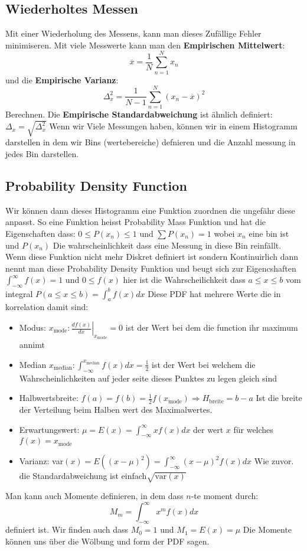 \documentclass{article}
\begin{document}
\hypertarget{PDF}{\subsection*{Wiederholtes Messen}}
Mit einer Wiederholung des Messens, kann man dieses Zufällige Fehler minimiseren. Mit viele Messwerte kann man den \textbf{Empirischen Mittelwert}:
\[\overline{x}=\frac{1}{N}\sum_{n=1}^N x_n\] und die \textbf{Empirische Varianz}:\[\Delta_x^2=\frac{1}{N-1}\sum_{n=1}^N(x_n-\overline{x})^2\]Berechnen. Die \textbf{Empirische Standardabweichung} ist ähnlich definiert: $\Delta_x=\sqrt{\Delta_x^2}$
\newline Wenn wir Viele Messungen haben, können wir in einem Histogramm darstellen in dem wir Bins (wertebereiche) defnieren und die Anzahl messung in jedes Bin darstellen.
\subsection*{Probability Density Function}
Wir können dann dieses Histogramm eine Funktion zuordnen die ungefähr diese anpasst. So eine Funktion heisst Probability Mass Funktion und hat die Eigenschaften dass: $0\le P(x_n)\le 1$ und $\sum P(x_n)=1$ wobei $x_n$ eine bin ist und $P(x_n)$ Die wahrscheinlichkeit dass eine Messung in diese Bin reinfällt.
Wenn diese Funktion nicht mehr Diskret definiert ist sondern Kontinuirlich dann nennt man diese Probability Density Funktion und beugt sich zur Eigencshaften $\int_{-\infty}^\infty f(x)=1$ und $0\le f(x)$ hier ist die Wahrscheilichkeit dass $a\le x\le b$ vom integral $P(a\le x\le b)=\int_a^b f(x) dx$
Diese PDF hat mehrere Werte die in korrelation damit sind:
\begin{itemize}
  \item{Modus: $x_\text{mode}:\left.\frac{df(x)}{dx}\right|_{x_\text{mode}}=0$  ist der Wert bei dem die function ihr maximum annimt}
  \item{Median $x_\text{median}:\int_{-\infty}^{x_\text{median}}f(x)dx=\frac{1}{2}$ ist der Wert bei welchem die Wahrscheinlichkeiten auf jeder seite dieses Punktes zu legen gleich sind}
  \item{Halbwertsbreite: $f(a)=f(b)=\frac{1}{2}f(x_\text{mode})\Longrightarrow H_\text{breite}=b-a$ Ist die breite der Verteilung beim Halben wert des Maximalwertes.}
  \item{Erwartungswert: $\mu=E(x)=\int_{-\infty}^\infty xf(x)dx$ der wert $x$ für welches $f(x)=x_\text{mode}$}
  \item{Varianz: var$(x)=E((x-\mu)^2)=\int_{-\infty}^\infty(x-\mu)^2f(x)dx$ Wie zuvor. die Standardabweichung ist einfach$\sqrt{\text{var}(x)}$}
\end{itemize}
Man kann auch Momente definieren, in dem dass $n$-te moment durch:\[M_m=\int_{-\infty}^\infty x^mf(x)dx\] definiert ist. Wir finden auch dass $M_0=1$ und $M_1=E(x)=\mu$
Die Momente können uns über die Wölbung und form der PDF sagen.
\end{document}
